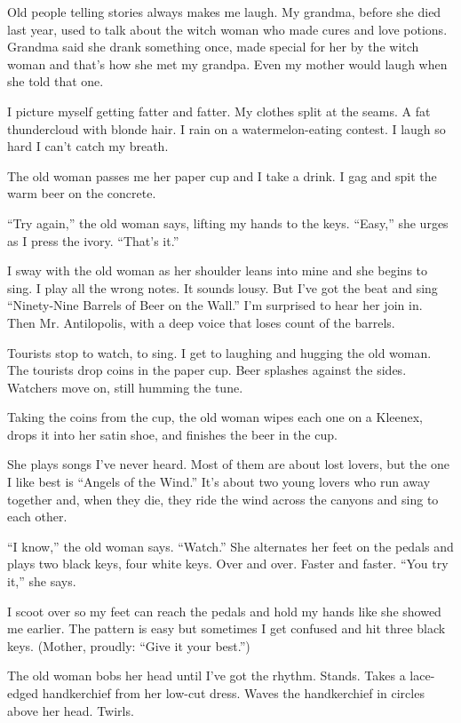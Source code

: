 \documentclass[
]{article}
\begin{document}
Old people telling stories always makes me laugh. My grandma, before she
died last year, used to talk about the witch woman who made cures and
love potions. Grandma said she drank something once, made special for
her by the witch woman and that's how she met my grandpa. Even my mother
would laugh when she told that one.

I picture myself getting fatter and fatter. My clothes split at the
seams. A fat thundercloud with blonde hair. I rain on a
watermelon-eating contest. I laugh so hard I can't catch my breath.

The old woman passes me her paper cup and I take a drink. I gag and spit
the warm beer on the concrete.

``Try again,'' the old woman says, lifting my hands to the keys.
``Easy,'' she urges as I press the ivory. ``That's it.''

I sway with the old woman as her shoulder leans into mine and she begins
to sing. I play all the wrong notes. It sounds lousy. But I've got the
beat and sing ``Ninety-Nine Barrels of Beer on the Wall.'' I'm surprised
to hear her join in. Then Mr. Antilopolis, with a deep voice that loses
count of the barrels.

Tourists stop to watch, to sing. I get to laughing and hugging the old
woman. The tourists drop coins in the paper cup. Beer splashes against
the sides. Watchers move on, still humming the tune.

Taking the coins from the cup, the old woman wipes each one on a
Kleenex, drops it into her satin shoe, and finishes the beer in the cup.

She plays songs I've never heard. Most of them are about lost lovers,
but the one I like best is ``Angels of the Wind.'' It's about two young
lovers who run away together and, when they die, they ride the wind
across the canyons and sing to each other.

``I know,'' the old woman says. ``Watch.'' She alternates her feet on
the pedals and plays two black keys, four white keys. Over and over.
Faster and faster. ``You try it,'' she says.

I scoot over so my feet can reach the pedals and hold my hands like she
showed me earlier. The pattern is easy but sometimes I get confused and
hit three black keys. (Mother, proudly: ``Give it your best.'')

The old woman bobs her head until I've got the rhythm. Stands. Takes a
lace-edged hand­kerchief from her low-cut dress. Waves the handkerchief
in circles above her head. Twirls.
\end{document}
